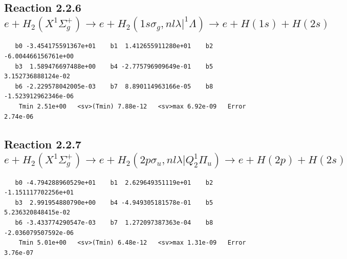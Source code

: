 \documentclass[12pt,dvipdfmx]{article}
\begin{document}
\newpage
\subsection{
Reaction 2.2.6 $e + H_2(X^1\Sigma_g^+) \rightarrow e + H_2(1s\sigma_g,nl\lambda|^1\Lambda) \rightarrow e +  H(1s) + H(2s)$}














\begin{small}\begin{verbatim}
   b0 -3.454175591367e+01    b1  1.412655911280e+01    b2 -6.004466156761e+00
   b3  1.589476697488e+00    b4 -2.775796909649e-01    b5  3.152736888124e-02
   b6 -2.229578042005e-03    b7  8.890114963166e-05    b8 -1.523912962346e-06
    Tmin 2.51e+00   <sv>(Tmin) 7.88e-12   <sv>max 6.92e-09   Error 2.74e-06
\end{verbatim}\end{small}

\newpage
\subsection{
Reaction 2.2.7 $ e + H_2(X^1\Sigma_g^+) \rightarrow e + H_2(2p\sigma_u, nl\lambda|Q_2^1\Pi_u) \rightarrow e + H(2p) + H(2s)$}














\begin{small}\begin{verbatim}
   b0 -4.794288960529e+01    b1  2.629649351119e+01    b2 -1.151117702256e+01
   b3  2.991954880790e+00    b4 -4.949305181578e-01    b5  5.236320848415e-02
   b6 -3.433774290547e-03    b7  1.272097387363e-04    b8 -2.036079507592e-06
    Tmin 5.01e+00   <sv>(Tmin) 6.48e-12   <sv>max 1.31e-09   Error 3.76e-07
\end{verbatim}\end{small}
\end{document}
